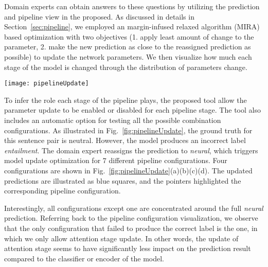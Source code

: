 Domain experts can obtain answers to these questions by utilizing the prediction and pipeline view in the proposed. As discussed in details in Section~\ref{sec:pipeline}, we employed an margin-infused relaxed algorithm (MIRA) based optimization with two objectives (1. apply least amount of change to the parameter, 2. make the new prediction as close to the reassigned prediction as possible) to update the network parameters.
%
We then visualize how much each stage of the model is changed through the distribution of parameters change.

\begin{figure*}[t]
\centering
\vspace{-2mm}
 \texttt{[image: pipelineUpdate]}
 \caption{
Experiment with all configurations for the label reassignment optimization. As shown in (d), the update of attention stage seems to have significantly less impact on the prediction result compared to the classifier or encoder of the model.
 }
\label{fig:pipelineUpdate}
\end{figure*}

To infer the role each stage of the pipeline plays, the proposed tool allow the parameter update to be enabled or disabled for each pipeline stage.
The tool also includes an automatic option for testing all the possible combination configurations. As illustrated in Fig.~\ref{fig:pipelineUpdate}, the ground truth for this sentence pair is neutral. However, the model produces an incorrect label \emph{entailment}. The domain expert reassigns the prediction to \emph{neural}, which triggers model update optimization for $7$ different pipeline configurations. Four configurations are shown in Fig.~\ref{fig:pipelineUpdate}(a)(b)(c)(d). The updated predictions are illustrated as blue squares, and the pointers highlighted the corresponding pipeline configuration.

Interestingly, all configurations except one are concentrated around the full \emph{neural} prediction. Referring back to the pipeline configuration visualization, we observe that the only configuration that failed to produce the correct label is the one, in which we only allow attention stage update.
%
In other words, the update of attention stage seems to have significantly less impact on the prediction result compared to the classifier or encoder of the model.

